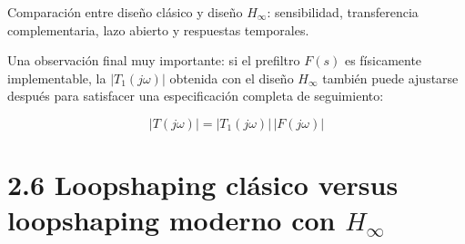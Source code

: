 \begin{images}[\label{img:comparacion-clasico-hinf}]{Comparación entre diseño clásico y diseño \(H_\infty\): sensibilidad, transferencia complementaria, lazo abierto y respuestas temporales.}
  \imagesnewline
  \imagesnewline
  \imagesnewline
  \imagesnewline
\end{images}

Una observación final muy importante: si el prefiltro \(F(s)\) es físicamente implementable, la \(|T_1(j\omega)|\) obtenida con el diseño \(H_\infty\) también puede ajustarse después para satisfacer una especificación completa de seguimiento:

$$
|T(j\omega)|=|T_1(j\omega)|\,|F(j\omega)|
$$

\section{2.6 Loopshaping clásico versus loopshaping moderno con \(H_\infty\)}


